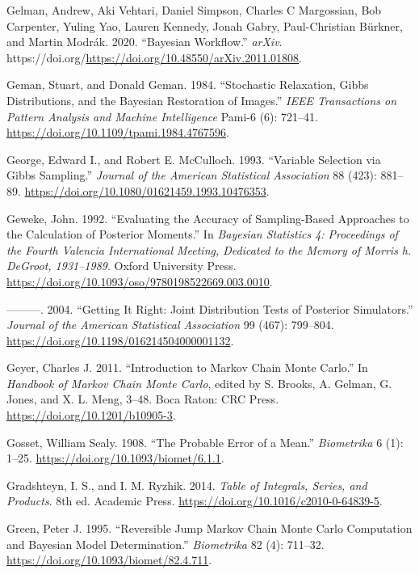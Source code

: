 \documentclass[
  11pt,
  letterpaper,
]{scrbook}
\newlength{\cslhangindent}
\newenvironment{CSLReferences}[2] %
 {\begin{list}{}{%
  \setlength{\itemindent}{0pt}
  \setlength{\leftmargin}{0pt}
  \setlength{\parsep}{0pt}
  \ifodd #1
   \setlength{\leftmargin}{\cslhangindent}
   \setlength{\itemindent}{-1\cslhangindent}
  \fi
  \setlength{\itemsep}{#2\baselineskip}}}
 {\end{list}}
\theoremstyle{plain}
\theoremstyle{definition}
\theoremstyle{definition}
\theoremstyle{plain}
\theoremstyle{plain}
\theoremstyle{definition}
\theoremstyle{remark}
\begin{document}
\begin{CSLReferences}{1}{0}
Gelman, Andrew, Aki Vehtari, Daniel Simpson, Charles C Margossian, Bob
Carpenter, Yuling Yao, Lauren Kennedy, Jonah Gabry, Paul-Christian
Bürkner, and Martin Modrák. 2020. {``Bayesian Workflow.''} \emph{arXiv}.
https://doi.org/\url{https://doi.org/10.48550/arXiv.2011.01808}.

Geman, Stuart, and Donald Geman. 1984. {``Stochastic Relaxation, {G}ibbs
Distributions, and the {B}ayesian Restoration of Images.''} \emph{IEEE
Transactions on Pattern Analysis and Machine Intelligence} Pami-6 (6):
721--41. \url{https://doi.org/10.1109/tpami.1984.4767596}.

George, Edward I., and Robert E. McCulloch. 1993. {``Variable Selection
via {G}ibbs Sampling.''} \emph{Journal of the American Statistical
Association} 88 (423): 881--89.
\url{https://doi.org/10.1080/01621459.1993.10476353}.

Geweke, John. 1992. {``Evaluating the Accuracy of Sampling-Based
Approaches to the Calculation of Posterior Moments.''} In \emph{Bayesian
Statistics 4: Proceedings of the Fourth Valencia International Meeting,
Dedicated to the Memory of Morris h. DeGroot, 1931--1989}. Oxford
University Press.
\url{https://doi.org/10.1093/oso/9780198522669.003.0010}.

---------. 2004. {``Getting It Right: Joint Distribution Tests of
Posterior Simulators.''} \emph{Journal of the American Statistical
Association} 99 (467): 799--804.
\url{https://doi.org/10.1198/016214504000001132}.

Geyer, Charles J. 2011. {``Introduction to {M}arkov Chain {M}onte
{C}arlo.''} In \emph{Handbook of {M}arkov Chain {M}onte {C}arlo}, edited
by S. Brooks, A. Gelman, G. Jones, and X. L. Meng, 3--48. Boca Raton:
CRC Press. \url{https://doi.org/10.1201/b10905-3}.

Gosset, William Sealy. 1908. {``The Probable Error of a Mean.''}
\emph{Biometrika} 6 (1): 1--25.
\url{https://doi.org/10.1093/biomet/6.1.1}.

Gradshteyn, I. S., and I. M. Ryzhik. 2014. \emph{Table of Integrals,
Series, and Products}. 8th ed. Academic Press.
\url{https://doi.org/10.1016/c2010-0-64839-5}.

Green, Peter J. 1995. {``Reversible Jump {M}arkov Chain {M}onte {C}arlo
Computation and {B}ayesian Model Determination.''} \emph{Biometrika} 82
(4): 711--32. \url{https://doi.org/10.1093/biomet/82.4.711}.


\end{CSLReferences}
\end{document}
